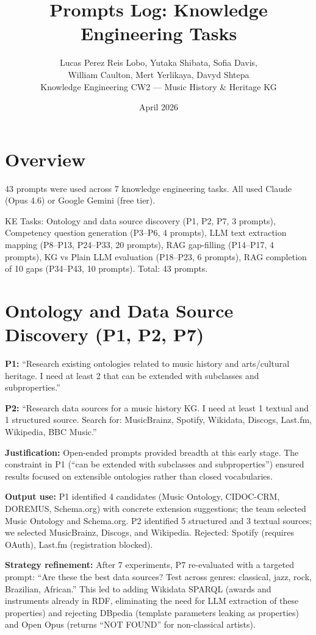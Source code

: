 \documentclass[11pt,a4paper]{article}
\title{Prompts Log: Knowledge Engineering Tasks}
\author{Lucas Perez Reis Lobo, Yutaka Shibata, Sofia Davis, \\ William Caulton, Mert Yerlikaya, Davyd Shtepa \\ \small Knowledge Engineering CW2 --- Music History \& Heritage KG}
\date{April 2026}
\begin{document}
\maketitle

\section{Overview}

43 prompts were used across 7 knowledge engineering tasks. All used Claude (Opus 4.6) or Google Gemini (free tier).

KE Tasks: Ontology and data source discovery (P1, P2, P7, 3 prompts), Competency question generation (P3--P6, 4 prompts), LLM text extraction mapping (P8--P13, P24--P33, 20 prompts), RAG gap-filling (P14--P17, 4 prompts), KG vs Plain LLM evaluation (P18--P23, 6 prompts), RAG completion of 10 gaps (P34--P43, 10 prompts). Total: 43 prompts.

\section{Ontology and Data Source Discovery (P1, P2, P7)}

\textbf{P1:} ``Research existing ontologies related to music history and arts/cultural heritage. I need at least 2 that can be extended with subclasses and subproperties.''

\textbf{P2:} ``Research data sources for a music history KG. I need at least 1 textual and 1 structured source. Search for: MusicBrainz, Spotify, Wikidata, Discogs, Last.fm, Wikipedia, BBC Music.''

\textbf{Justification:} Open-ended prompts provided breadth at this early stage. The constraint in P1 (``can be extended with subclasses and subproperties'') ensured results focused on extensible ontologies rather than closed vocabularies.

\textbf{Output use:} P1 identified 4 candidates (Music Ontology, CIDOC-CRM, DOREMUS, Schema.org) with concrete extension suggestions; the team selected Music Ontology and Schema.org. P2 identified 5 structured and 3 textual sources; we selected MusicBrainz, Discogs, and Wikipedia. Rejected: Spotify (requires OAuth), Last.fm (registration blocked).

\textbf{Strategy refinement:} After 7 experiments, P7 re-evaluated with a targeted prompt: ``Are these the best data sources? Test across genres: classical, jazz, rock, Brazilian, African.'' This led to adding Wikidata SPARQL (awards and instruments already in RDF, eliminating the need for LLM extraction of these properties) and rejecting DBpedia (template parameters leaking as properties) and Open Opus (returns ``NOT FOUND'' for non-classical artists).
\end{document}
